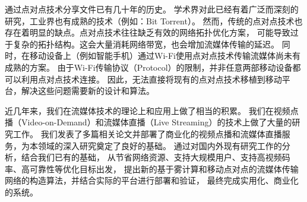 通过点对点技术分享文件已有几十年的历史。
学术界对此已经有着广泛而深刻的研究，工业界也有成熟的技术（例如：Bit Torrent）。
然而，传统的点对点技术也存在着明显的缺点。点对点技术往往缺乏有效的网络拓扑优化方案，
可能导致过于复杂的拓扑结构。这会大量消耗网络带宽，也会增加流媒体传输的延迟。
同时，在移动设备上（例如智能手机）通过Wi-Fi使用点对点技术传输流媒体尚未有成熟的方案。
由于Wi-Fi传输协议（Protocol）的限制，并非任意两部移动设备都可以利用点对点技术连接。
因此，无法直接将现有的点对点技术移植到移动平台，解决这些问题需要新的设计和算法。

近几年来，我们在流媒体技术的理论上和应用上做了相当的积累。
我们在视频点播（Video-on-Demand）和流媒体直播（Live Streaming）的技术上做了大量的研究工作。
我们发表了多篇相关论文并部署了商业化的视频点播和流媒体直播服务，为本领域的深入研究奠定了良好的基础。
通过对国内外现有研究工作的分析，结合我们已有的基础，
从节省网络资源、支持大规模用户、支持高视频码率、高可靠性等优化目标出发，
提出新的基于雾计算和移动点对点的流媒体传输网络的构造算法，并结合实际的平台进行部署和验证，
最终完成实用化、商业化的系统。
{


}
